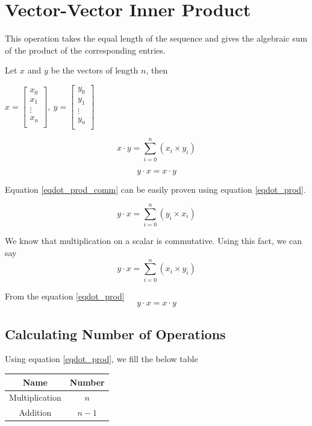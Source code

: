 \chapter{Vector-Vector Inner Product}

This operation takes the equal length of the 
sequence and gives the algebraic sum of the product of the corresponding entries.

Let $x$ and $y$ be the vectors of length $n$, then

$x = 
\begin{bmatrix}
    x_0 \\    
    x_1 \\    
    \vdots \\
    x_n \\    
\end{bmatrix}
,\ y = 
\begin{bmatrix}
    y_0 \\    
    y_1 \\    
    \vdots \\
    y_n \\    
\end{bmatrix}
$

\begin{equation}
    x \cdot y = \sum_{i=0}^{n}(x_i \times y_i)
    \label{eqdot_prod}
\end{equation}

\begin{equation}
    y \cdot x = x \cdot y
    \label{eqdot_prod_comm}
\end{equation}

Equation \ref{eqdot_prod_comm} can be easily proven using equation \ref{eqdot_prod}.

\[y \cdot x = \sum_{i=0}^{n}(y_i \times x_i)\]

We know that multiplication on a scalar is commutative. Using this fact, we can say
\[y \cdot x = \sum_{i=0}^{n}(x_i \times y_i)\]

From the equation \ref{eqdot_prod}
\[y \cdot x = x \cdot y\]

\section{Calculating Number of Operations}

Using equation \ref{eqdot_prod}, we fill the below table

\begin{table}[ht]
    \centering
    \begin{tabular}{|c|c|}
        \hline
        \textbf{Name} & \textbf{Number} \\
        \hline
        Multiplication & $n$ \\
        \hline
        Addition & $n - 1$ \\
        \hline
    \end{tabular}
\end{table}

